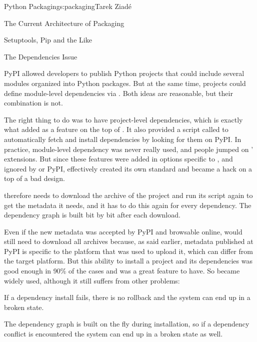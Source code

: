 \begin{aosachapter}{Python Packaging}{s:packaging}{Tarek Ziad\'{e}}
\begin{aosasect1}{The Current Architecture of Packaging}
\begin{aosasect2}{Setuptools, Pip and the Like}
\begin{aosasect3}{The Dependencies Issue}

PyPI allowed developers to publish Python projects that could include
several modules organized into Python packages. But at the same time,
projects could define module-level dependencies via .
Both ideas are reasonable, but their combination is not.

The right thing to do was to have project-level dependencies, which is
exactly what  added as a feature on the top of
.  It also provided a script called
 to automatically fetch and install dependencies
by looking for them on PyPI\@.  In practice, module-level dependency was
never really used, and people jumped on ' extensions.
But since these features were added in options specific to
, and ignored by  or PyPI,
 effectively created its own standard and became a
hack on a top of a bad design.

 therefore needs to download the archive of the
project and run its  script again to get the metadata
it needs, and it has to do this again for every dependency. The
dependency graph is built bit by bit after each download.

Even if the new metadata was accepted by PyPI and browsable online,
 would still need to download all archives
because, as said earlier, metadata published at PyPI is specific to
the platform that was used to upload it, which can differ from the
target platform.  But this ability to install a project and its
dependencies was good enough in 90\% of the cases and was a great
feature to have. So  became widely used, although it
still suffers from other problems:

\begin{aosaitemize}

  \item If a dependency install fails, there is no rollback and the
  system can end up in a broken state.

  \item The dependency graph is built on the fly during installation, so
  if a dependency conflict is encountered the system can end up in a
  broken state as well.

\end{aosaitemize}

\end{aosasect3}


\end{aosasect2}
\end{aosasect1}
\end{aosachapter}
